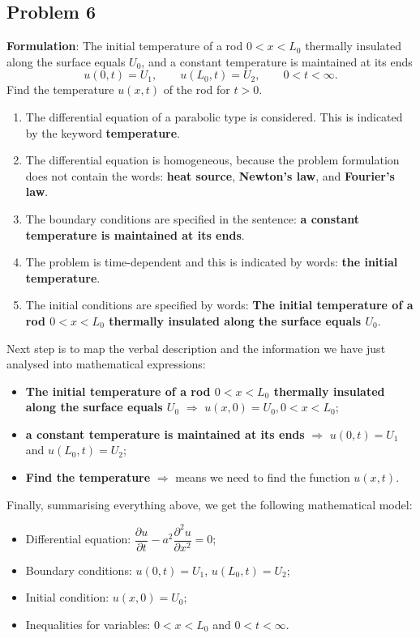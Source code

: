 \subsection{Problem 6}

{\bfseries Formulation}: The initial temperature of a rod $0< x< L_{0}$ thermally insulated along the surface equals $U_{0}$, and a constant temperature is maintained at its ends 
\begin{equation*}
u(0,t)=U_{1}, \qquad u(L_{0},t)=U_{2}, \qquad 0<t<\infty.
\end{equation*}
Find the temperature $u(x,t)$ of the rod for $t>0$.
\begin{enumerate}
\item The differential equation of a parabolic type is considered. This is indicated by the keyword {\bfseries temperature}.
\item The differential equation is homogeneous, because the problem formulation does not contain the words: {\bfseries heat source}, {\bfseries Newton's law}, and {\bfseries Fourier's law}.
\item The boundary conditions are specified in the sentence: {\bfseries a constant temperature is maintained at its ends}.
\item The problem is time-dependent and this is indicated by words: {\bfseries the initial temperature}.
\item The initial conditions are specified by words: {\bfseries The initial temperature of a rod $0< x< L_{0}$ thermally insulated along the surface equals $U_{0}$}.
\end{enumerate}
Next step is to map the verbal description and the information we have just analysed into mathematical expressions:
\begin{itemize}
\item {\bfseries The initial temperature of a rod $0< x< L_{0}$ thermally insulated along the surface equals $U_{0}$} $\Longrightarrow$ $u(x,0)=U_{0}, 0<x<L_{0}$;
\item {\bfseries  a constant temperature is maintained at its ends} $\Longrightarrow$ $u(0,t)=U_{1}$ and $u(L_{0},t)=U_{2}$;
\item {\bfseries Find the temperature} $\Longrightarrow$ means we need to find the function $u(x,t)$.
\end{itemize}
Finally, summarising everything above, we get the following mathematical model:
\begin{itemize}
\item Differential equation: $\dfrac{\partial u}{\partial t} - a^{2}\dfrac{\partial^{2} u}{\partial x^{2}}=0$;
\item Boundary conditions: $u(0,t)=U_{1}$, $u(L_{0},t)=U_{2}$;
\item Initial condition: $u(x,0)=U_{0}$;
\item Inequalities for variables: $0<x<L_{0}$ and $0<t<\infty$.
\end{itemize}

